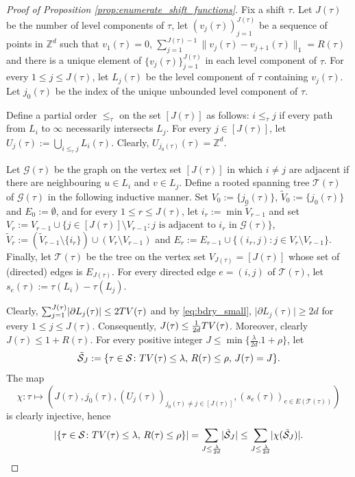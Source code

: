 \documentclass[11pt, reqno]{amsart}
\numberwithin{equation}{section}
\begin{document}
\begin{proof}[Proof of Proposition \ref{prop:enumerate_shift_functions}]
Fix a shift $\tau$.
Let $J(\tau)$ be the number of level components of $\tau$, let $(v_j(\tau))_{j=1}^{J(\tau)}$ be a sequence of points in ${\mathbb Z}^d$ such that $v_1(\tau)=0$, $\sum_{j=1}^{J(\tau)-1}\lVert v_j(\tau)-v_{j+1}(\tau)\rVert_1=R(\tau)$ and there is a unique element of $\{v_j(\tau)\}_{j=1}^{J(\tau)}$ in each level component of $\tau$.
For every $1\leq j\leq J(\tau)$, let $L_j(\tau)$ be the level component of $\tau$ containing $v_j(\tau)$. 
Let $j_0(\tau)$ be the index of the unique unbounded level component of $\tau$.

Define a partial order $\leq_{\tau}$ on the set $[J(\tau)]$ as follows: $i\leq_{\tau}j$ if every path from $L_i$ to $\infty$ necessarily intersects $L_j$.
For every $j\in[J(\tau)]$, let $U_j(\tau):=\bigcup_{i\leq_{\tau}j}L_i(\tau)$.
Clearly, $U_{j_0(\tau)}(\tau)={\mathbb Z}^d$. 

Let ${\mathcal G}(\tau)$ be the graph on the vertex set $[J(\tau)]$ in which $i\neq j$ are adjacent if there are neighbouring $u\in L_i$ and $v\in L_j$.
Define a rooted spanning tree ${\mathcal T}(\tau)$ of ${\mathcal G}(\tau)$ in the following inductive manner. 
Set $V_0:=\{j_0(\tau)\}$, $\tilde{V}_0:=\{j_0(\tau)\}$ and $E_0:=\emptyset$, and for every $1\leq r\leq J(\tau)$, let $i_r:=\min \tilde{V}_{r-1}$ and set $V_r:=V_{r-1}\cup\{j\in [J(\tau)]\setminus V_{r-1}: j \text{ is adjacent to } i_r \text{ in } {\mathcal G}(\tau)\}$, $\tilde{V}_r:=(\tilde{V}_{r-1}\setminus\{i_r\})\cup(V_r\setminus V_{r-1})$ and $E_r:=E_{r-1}\cup\{(i_r,j):j\in V_r\setminus V_{r-1}\}$.
Finally, let ${\mathcal T}(\tau)$ be the tree on the vertex set $V_{J(\tau)}=[J(\tau)]$ whose set of (directed) edges is $E_{J(\tau)}$. 
For every directed edge $e=(i,j)$ of ${\mathcal T}(\tau)$, let $s_e(\tau):=\tau(L_i)-\tau(L_j)$.

Clearly, $\sum_{j=1}^{J(\tau)} \lvert\partial L_j(\tau)\rvert\leq 2{\rm TV}(\tau)$ and by \eqref{eq:bdry_small}, $\lvert\partial L_j(\tau)\rvert\geq 2d$ for  every $1\leq j\leq J(\tau)$.
Consequently, $J(\tau)\leq\frac{1}{2d}{\rm TV}(\tau)$. Moreover, clearly $J(\tau)\leq 1+R(\tau)$.
For every positive integer $J\leq\min\{\frac{\lambda}{2d}.1+\rho\}$, let
$$\tilde{\mathcal S}_J:=\{\tau\in{\mathcal S}\colon {\rm TV}(\tau) \leq \lambda,\, R(\tau) \leq \rho,\, J(\tau)=J\}.$$
The map 
$$
\chi\colon \tau\mapsto
\left(J(\tau),
j_0(\tau),
(U_j(\tau))_{j_0(\tau)\neq j\in[J(\tau)]},
(s_e(\tau))_{e\in E({\mathcal T}(\tau))}\right)
$$
is clearly injective, hence
\begin{equation}\label{eq:by_injectivity}
\lvert\{\tau\in{\mathcal S}\colon {\rm TV}(\tau) \leq \lambda,\, R(\tau) \leq \rho\}\rvert=\sum_{J\leq\frac{\lambda}{2d}}\lvert\tilde{\mathcal S}_J\rvert\leq \sum_{J\leq\frac{\lambda}{2d}}\lvert\chi(\tilde{\mathcal S}_J)\rvert.     
\end{equation}


\end{proof}
\end{document}
